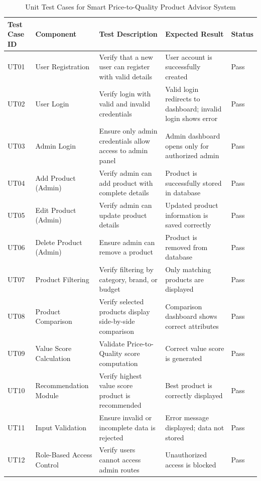 \begin{table}[H]
\centering
\small
\renewcommand{\arraystretch}{1.3}
\begin{tabular}{|p{1.5cm}|p{3cm}|p{3.3cm}|p{3.1cm}|p{1.2cm}|}
    \hline
    \textbf{Test Case ID} & \textbf{Component} & \textbf{Test Description} & \textbf{Expected Result} & \textbf{Status} \\
    \hline

    UT01 & User Registration & Verify that a new user can register with valid details & User account is successfully created & Pass \\
    \hline
    UT02 & User Login & Verify login with valid and invalid credentials & Valid login redirects to dashboard; invalid login shows error & Pass \\
    \hline
    UT03 & Admin Login & Ensure only admin credentials allow access to admin panel & Admin dashboard opens only for authorized admin & Pass \\
    \hline
    UT04 & Add Product (Admin) & Verify admin can add product with complete details & Product is successfully stored in database & Pass \\
    \hline
    UT05 & Edit Product (Admin) & Verify admin can update product details & Updated product information is saved correctly & Pass \\
    \hline
    UT06 & Delete Product (Admin) & Ensure admin can remove a product & Product is removed from database & Pass \\
    \hline
    UT07 & Product Filtering & Verify filtering by category, brand, or budget & Only matching products are displayed & Pass \\
    \hline
    UT08 & Product Comparison & Verify selected products display side-by-side comparison & Comparison dashboard shows correct attributes & Pass \\
    \hline
    UT09 & Value Score Calculation & Validate Price-to-Quality score computation & Correct value score is generated & Pass \\
    \hline
    UT10 & Recommendation Module & Verify highest value score product is recommended & Best product is correctly displayed & Pass \\
    \hline
    UT11 & Input Validation & Ensure invalid or incomplete data is rejected & Error message displayed; data not stored & Pass \\
    \hline
    UT12 & Role-Based Access Control & Verify users cannot access admin routes & Unauthorized access is blocked & Pass \\

\end{tabular}
\caption{Unit Test Cases for Smart Price-to-Quality Product Advisor System}
\label{tab:unit_tests}
\end{table}







